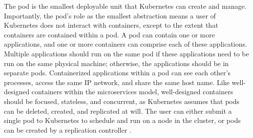 The pod is the smallest deployable unit that Kubernetes can create and
manage. Importantly, the pod's role as the smallest abstraction means a user of
Kubernetes does not interact with containers, except to the extent that
containers are contained within a pod. A pod can contain one or more
applications, and one or more containers can comprise each of these applications.
Multiple applications should run on the same pod
if these applications need to be run on the same
physical machine; otherwise, the applications should be in separate pods.
Containerized applications within a pod can see each other's processes,
access the same IP network, and share the same host name. Like well-designed
containers within the microservices model, well-designed containers should be
focused, stateless, and concurrent, as Kubernetes assumes that pods can be deleted,
created, and replicated at will. The user can either submit a
single pod to Kubernetes to schedule and run on a node in the cluster, or pods
can be created by a replication controller \cite{k8s-pods}.
